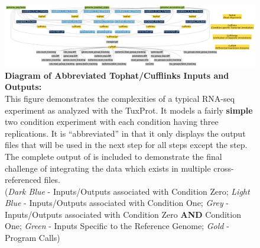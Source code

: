

\begin{landscape}
 
 
 \begin{figure}[hp]
\centering
\includegraphics[width=\linewidth]{figures/figs/tuxedo_dot/707354_6/tophat_cufflinks_ins_outs.pdf}
\caption[Diagram of Abbreviated Tophat/Cufflinks Inputs and Outputs]{\sf \textbf{Diagram of Abbreviated Tophat/Cufflinks Inputs and Outputs:}\\
	This figure demonstrates the complexities of a typical RNA-seq experiment as analyzed with the \gls{TuxProt}. It models a fairly \textbf{simple} two condition experiment with each condition having three replications. It is ``abbreviated'' in that it only displays the output files that will be used in the next step for all steps except the  step. The complete output of  is included to demonstrate the final challenge of integrating the data which exists in multiple cross-referenced files.\\ 
	(\emph{Dark Blue} - Inputs/Outputs associated with Condition Zero; 
	\emph{Light Blue} - Inputs/Outputs associated with Condition One; 
	\emph{Grey} - Inputs/Outputs associated with Condition Zero \textbf{AND} Condition One; 
	\emph{Green} - Inputs Specific to the Reference Genome; 
	\emph{Gold} - Program Calls)
}
	\label{fig:tuxedo}
\end{figure}
 
 
 
\end{landscape}

